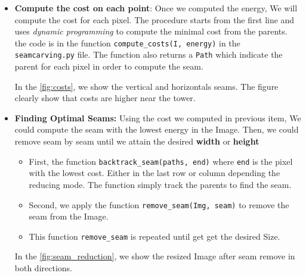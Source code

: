 \documentclass[a4paper, nobib]{tufte-handout}
\begin{document}
\begin{enumerate}
  \begin{itemize}
    \item \textbf{Compute the cost on each point}: Once we computed the energy,
      We will compute the cost for each pixel. The procedure starts from the
      first line and uses \emph{dynamic programming} to compute the minimal cost
      from the parents. the code is in the function
      \texttt{compute_costs(I, energy)} in the
      \texttt{seamcarving.py} file. The function also returns a \texttt{Path}
      which indicate the parent for each pixel in order to compute the seam.
      
      In the \autoref{fig:costs}, we show the vertical and horizontals seams.
      The figure clearly show that costs are higher near the tower.

    \item \textbf{Finding Optimal Seams:}  Using the cost we computed in
      previous item, We could compute the seam with the lowest energy in the
      Image. Then, we could remove seam by seam until we attain the desired
      \textbf{width} or \textbf{height}

      \begin{itemize}
        \item First, the function \texttt{backtrack_seam(paths, end)} where \texttt{end} is the pixel with the lowest cost. Either in
          the last row or column depending the reducing mode. The function
          simply track the parents to find the seam.
        \item Second, we apply  the function \texttt{remove_seam(Img,
          seam)} to remove the seam from the Image.

        \item This function \texttt{remove\_seam} is repeated until get get the
          desired Size. 
      \end{itemize}
      In the \autoref{fig:seam_reduction}, we show the resized Image after seam
      remove in both directions.
  \end{itemize}



\end{enumerate}
\end{document}
